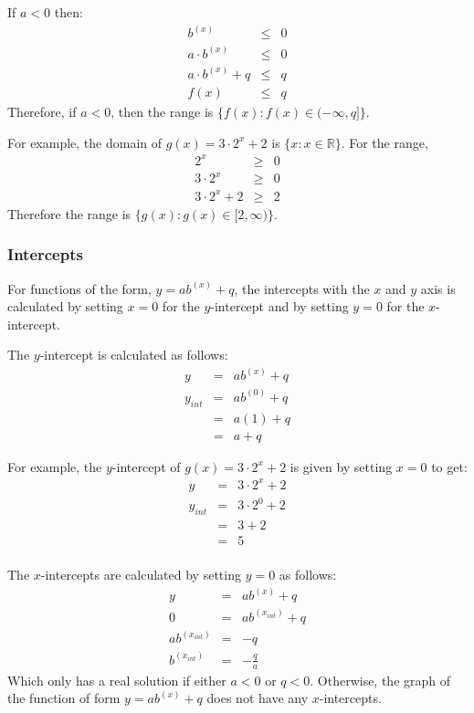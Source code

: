 \documentclass[10pt,a4paper,titlepage,twoside,openright]{report}
\begin{document}
If $a<0$ then:
\begin{eqnarray*}
b^{(x)} &\le& 0\\
a\cdot b^{(x)} &\le& 0\\
a\cdot b^{(x)}+q &\le& q\\
f(x) &\le& q
\end{eqnarray*}
Therefore, if $a<0$, then the range is $\{f(x):f(x)\in(-\infty,q]\}$.

For example, the domain of $g(x)=3\cdot 2^{x} + 2$ is $\{x:x\in\mathbb{R}\}$.
For the range,
\begin{eqnarray*}
2^{x}&\ge&0\\
3 \cdot 2^{x}&\ge&0\\
3 \cdot 2^{x}+2&\ge&2
\end{eqnarray*}
Therefore the range is $\{g(x):g(x)\in[2,\infty)\}$.

\subsubsection{Intercepts}
For functions of the form, $y=ab^{(x)} + q$, the intercepts with the $x$ and $y$ axis is calculated by setting $x=0$ for the $y$-intercept and by setting $y=0$ for the $x$-intercept.

The $y$-intercept is calculated as follows:
\begin{eqnarray}
y&=&ab^{(x)} + q\\
y_{int}&=&ab^{(0)} + q\\
&=&a(1)+q\\
&=&a+q
\end{eqnarray}

For example, the $y$-intercept of $g(x)=3\cdot 2^{x} + 2$ is given by setting $x=0$ to get:
\begin{eqnarray*}
y&=&3\cdot 2^{x} + 2\\
y_{int}&=&3\cdot 2^{0} + 2\\
&=&3 + 2\\
&=&5\\
\end{eqnarray*}

The $x$-intercepts are calculated by setting $y=0$ as follows:
\begin{eqnarray}
y&=&ab^{(x)} + q\\
0&=&ab^{(x_{int})} + q\\
ab^{(x_{int})}&=&-q\\
b^{(x_{int})}&=&-\frac{q}{a}
\end{eqnarray}
Which only has a real solution if either $a<0$ or $q<0$. Otherwise, the graph of the function of form $y=ab^{(x)} + q$ does not have any $x$-intercepts.
\end{document}
